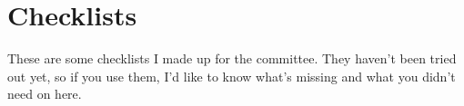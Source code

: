 \section{Checklists}

These are some checklists I made up for the committee. They haven't been tried out yet, so if you use them, I'd like to know what's missing and what you didn't need on here.


